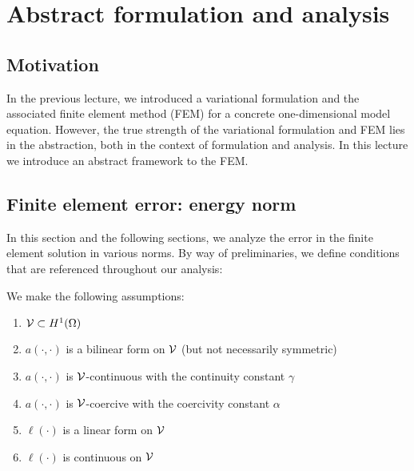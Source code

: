 \chapter{Abstract formulation and analysis}

\disclaimer

\section{Motivation}
In the previous lecture, we introduced a variational formulation and the associated finite element method (FEM) for a concrete one-dimensional model equation.  However, the true strength of the variational formulation and FEM lies in the abstraction, both in the context of formulation and analysis.  In this lecture we introduce an abstract framework to the FEM.




\section{Finite element error: energy norm}
In this section and the following sections, we analyze the error in the finite element solution in various norms. By way of preliminaries, we define conditions that are referenced throughout our analysis:
\begin{assumption}
  We make the following assumptions:
\begin{enumerate}
  \item $\mathcal{V} \subset H^1(\Omega)$
  \item $a(\cdot,\cdot)$ is a bilinear form on $\mathcal{V}$ (but not necessarily symmetric)
  \item $a(\cdot,\cdot)$ is $\mathcal{V}$-continuous with the continuity constant $\gamma$
  \item $a(\cdot,\cdot)$ is $\mathcal{V}$-coercive with the coercivity constant $\alpha$
  \item $\ell(\cdot)$ is a linear form on $\mathcal{V}$
  \item $\ell(\cdot)$ is continuous on $\mathcal{V}$
\end{enumerate}
\end{assumption}



